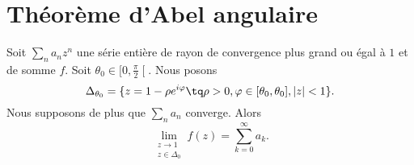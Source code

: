 \section{Théorème d'Abel angulaire}

\begin{theorem}   \label{ThoTGjmeen}
    Soit \( \sum_{n}a_nz^n\) une série entière de rayon de convergence plus grand ou égal à \( 1\) et de somme \( f\). Soit \( \theta_0\in\mathopen[ 0 , \frac{ \pi }{2} \mathclose[\). Nous posons
    \begin{equation}
        \Delta_{\theta_0}=\{ z=1-\rho e^{i\varphi}\tq \rho>0,\varphi\in\mathopen[ \theta_0 , \theta_0 \mathclose],| z |<1 \}.
    \end{equation}
    Nous supposons de plus que \( \sum_na_n\) converge. Alors
    \begin{equation}
        \lim_{\substack{z\to1\\z\in\Delta_0}}f(z)=\sum_{k=0}^{\infty}a_k.
    \end{equation}
\end{theorem}

